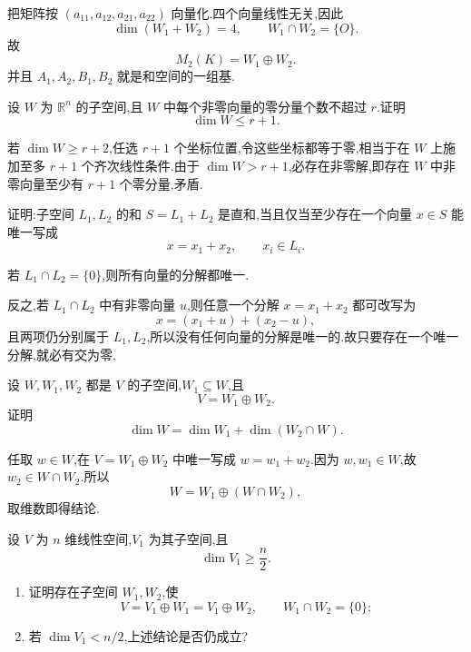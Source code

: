 \begin{solution}
把矩阵按 $(a_{11},a_{12},a_{21},a_{22})$ 向量化.四个向量线性无关,因此
\[
\dim(W_1+W_2)=4,
\qquad W_1\cap W_2=\{O\}.
\]
故
\[
\boxed{M_2(K)=W_1\oplus W_2}.
\]
并且 $A_1,A_2,B_1,B_2$ 就是和空间的一组基.
\end{solution}

\begin{example}
设 $W$ 为 $\mathbb{R}^n$ 的子空间,且 $W$ 中每个非零向量的零分量个数不超过 $r$.证明
\[
\dim W\leq r+1.
\]
\end{example}
\exampleblank

\begin{solution}
若 $\dim W\geq r+2$,任选 $r+1$ 个坐标位置,令这些坐标都等于零,相当于在 $W$ 上施加至多 $r+1$ 个齐次线性条件.由于 $\dim W>r+1$,必存在非零解,即存在 $W$ 中非零向量至少有 $r+1$ 个零分量,矛盾.
\end{solution}

\begin{example}
证明:子空间 $L_1,L_2$ 的和 $S=L_1+L_2$ 是直和,当且仅当至少存在一个向量 $x\in S$ 能唯一写成
\[
x=x_1+x_2,\qquad x_i\in L_i.
\]
\end{example}
\exampleblank

\begin{solution}
若 $L_1\cap L_2=\{0\}$,则所有向量的分解都唯一.

反之,若 $L_1\cap L_2$ 中有非零向量 $u$,则任意一个分解 $x=x_1+x_2$ 都可改写为
\[
x=(x_1+u)+(x_2-u),
\]
且两项仍分别属于 $L_1,L_2$,所以没有任何向量的分解是唯一的.故只要存在一个唯一分解,就必有交为零.
\end{solution}

\begin{example}
设 $W,W_1,W_2$ 都是 $V$ 的子空间,$W_1\subseteq W$,且
\[
V=W_1\oplus W_2.
\]
证明
\[
\dim W=\dim W_1+\dim(W_2\cap W).
\]
\end{example}
\exampleblank

\begin{solution}
任取 $w\in W$,在 $V=W_1\oplus W_2$ 中唯一写成 $w=w_1+w_2$.因为 $w,w_1\in W$,故 $w_2\in W\cap W_2$.所以
\[
W=W_1\oplus(W\cap W_2),
\]
取维数即得结论.
\end{solution}

\begin{example}
设 $V$ 为 $n$ 维线性空间,$V_1$ 为其子空间,且
\[
\dim V_1\geq\dfrac n2.
\]
\begin{enumerate}
  \item 证明存在子空间 $W_1,W_2$,使
  \[
  V=V_1\oplus W_1=V_1\oplus W_2,
  \qquad W_1\cap W_2=\{0\};
  \]
  \item 若 $\dim V_1<n/2$,上述结论是否仍成立?
\end{enumerate}
\end{example}
\exampleblank


